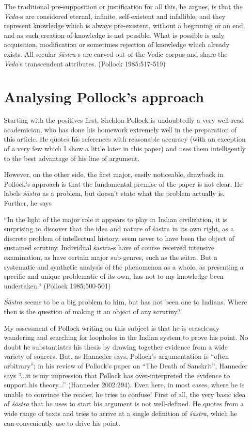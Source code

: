 
The traditional pre-supposition or justification for all this, he argues, is that the {\it Veda}-s are considered eternal, infinite, self-existent and infallible; and they represent knowledge which is always pre-existent, without a beginning or an end, and as such creation of knowledge is not possible. What is possible is only acquisition, modification or sometimes rejection of knowledge which already exists. All secular {\it śāstra}-s are carved out of the Vedic corpus and share the {\it Veda}'s transcendent attributes. (Pollock 1985:517-519)

\section*{Analysing Pollock's approach}

Starting with the positives first, Sheldon Pollock is undoubtedly a very well read academician, who has done his homework extremely well in the preparation of this article. He quotes his references with reasonable accuracy (with an exception of a very few which I show a little later in this paper) and uses them intelligently to the best advantage of his line of argument. 

However, on the other side, the first major, easily noticeable, drawback in Pollock's approach is that the fundamental premise of the paper is not clear. He labels {\it śāstra} as a problem, but doesn't state what the problem actually is. Further, he says
\begin{myquote}
``In the light of the major role it appears to play in Indian civilization, it is surprising to discover that the idea and nature of śāstra in its own right, as a discrete problem of intellectual history, seem never to have been the object of sustained scrutiny. Individual śāstra-s have of course received intensive examination, as have certain major sub-genres, such as the sūtra. But a systematic and synthetic analysis of the phenomenon as a whole, as presenting a specific and unique problematic of its own, has not to my knowledge been undertaken.'' (Pollock 1985:500-501)
\end{myquote}

{\it Śāstra} seems to be a big problem to him, but has not been one to Indians. Where then is the question of making it an object of any scrutiny? 

My assessment of Pollock writing on this subject is that he is ceaselessly wandering and searching for loopholes in the Indian system to prove his point. No doubt he substantiates his thesis by drawing together evidence from a wide variety of sources. But, as Hanneder says, Pollock's argumentation is ``often arbitrary''; in his review of Pollock's paper on ``The Death of Sanskrit'', Hanneder says ``...it is my impression that Pollock has over-interpreted the evidence to support his theory...'' (Hanneder 2002:294). Even here, in most cases, where he is unable to convince the reader, he tries to confuse! First of all, the very basic idea of {\it śāstra} that he uses to start his argument is not well-defined. He quotes from a wide range of texts and tries to arrive at a single definition of {\it śāstra}, which he can conveniently use to drive his point. 


